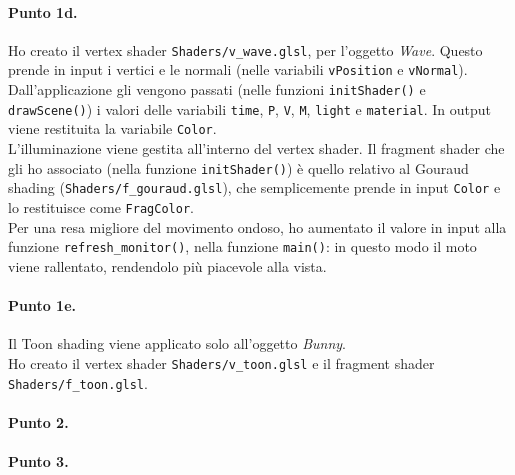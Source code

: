 \documentclass[a4paper, 12pt]{article}
\begin{document}
\paragraph{Punto 1d.}
Ho creato il vertex shader \texttt{Shaders/v\_wave.glsl}, per l'oggetto \textit{Wave}. Questo prende in input i vertici e le normali (nelle variabili \texttt{vPosition} e \texttt{vNormal}). Dall'applicazione gli vengono passati (nelle funzioni \texttt{initShader()} e \texttt{drawScene()}) i valori delle variabili \texttt{time}, \texttt{P}, \texttt{V}, \texttt{M}, \texttt{light} e \texttt{material}. In output viene restituita la variabile \texttt{Color}.\\
L'illuminazione viene gestita all'interno del vertex shader. Il fragment shader che gli ho associato (nella funzione \texttt{initShader()}) è quello relativo al Gouraud shading (\texttt{Shaders/\allowbreak f\_gouraud.glsl}), che semplicemente prende in input \texttt{Color} e lo restituisce come \texttt{FragColor}.\\
Per una resa migliore del movimento ondoso, ho  aumentato il valore in input alla funzione \texttt{refresh\_monitor()}, nella funzione \texttt{main()}: in questo modo il moto viene rallentato, rendendolo più piacevole alla vista.

\paragraph{Punto 1e.}
Il Toon shading viene applicato solo all'oggetto \textit{Bunny}.\\
Ho creato il vertex shader \texttt{Shaders/v\_toon.glsl} e il fragment shader \texttt{Shaders/\allowbreak f\_toon.glsl}. %

\paragraph{Punto 2.}
\paragraph{Punto 3.}


\end{document}
